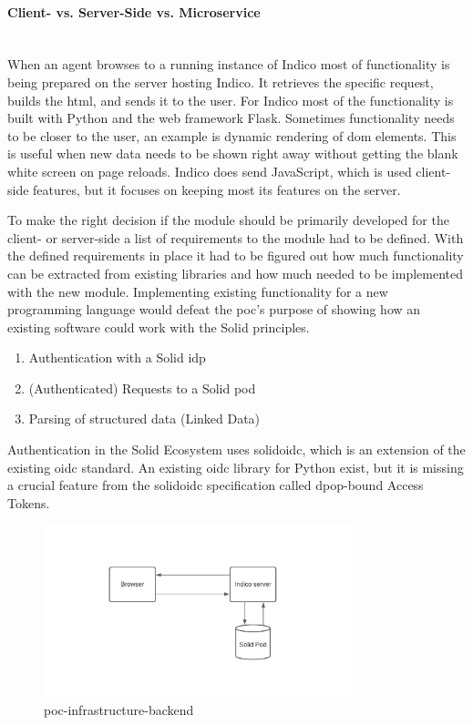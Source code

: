 \paragraph{Client- vs. Server-Side vs. Microservice}\mbox{}\\

When an agent browses to a running instance of Indico most of functionality is being prepared on the server hosting Indico. It retrieves the specific request, builds the \gls{html}, and sends it to the user. For Indico most of the functionality is built with Python and the web framework Flask. Sometimes functionality needs to be closer to the user, an example is dynamic rendering of \gls{dom} elements. This is useful when new data needs to be shown right away without getting the blank white screen on page reloads.
Indico does send JavaScript, which is used client-side features, but it focuses on keeping most its features on the server.

To make the right decision if the module should be primarily developed for the client- or server-side a list of requirements to the module had to be defined. With the defined requirements in place it had to be figured out how much functionality can be extracted from existing libraries and how much needed to be implemented with the new module. Implementing existing functionality for a new programming language would defeat the \gls{poc}’s purpose of showing how an existing software could work with the Solid principles.

\begin{enumerate}
    \item Authentication with a Solid \gls{idp}
    \item (Authenticated) Requests to a Solid pod
    \item Parsing of structured data (Linked Data)
\end{enumerate}

Authentication in the Solid Ecosystem uses \gls{solidoidc}, which is an extension of the existing \gls{oidc} standard. An existing \gls{oidc} library for Python exist, but it is missing a crucial feature from the \gls{solidoidc} specification called \gls{dpop}-bound Access Tokens.

\begin{figure}
    \centering
    \includegraphics[width=0.8\textwidth]{prototype/graphs/poc-infrastructure-backend.jpeg}
    \caption{poc-infrastructure-backend}
    \label{fig:poc-infrastructure-backend}
\end{figure}


